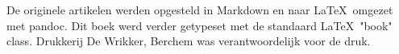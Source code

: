 \mbox{}
\vfill
De originele artikelen werden opgesteld in Markdown
en naar \LaTeX\ omgezet met pandoc.
Dit boek werd verder getypeset met de standaard \LaTeX\ "book" class.
Drukkerij De Wrikker, Berchem was verantwoordelijk voor de druk.
\doclicenseThis
